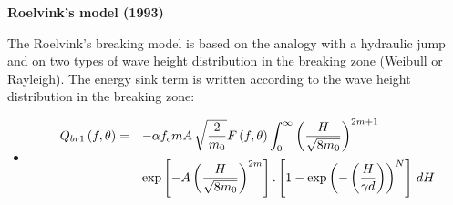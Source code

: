 {\bf  Roelvink's model (1993)}

 The Roelvink's breaking model \cite{Roelvink1993} is based on the analogy with a hydraulic jump and on two types of wave height distribution in the breaking zone (Weibull or Rayleigh). The energy sink term is written according to the wave height distribution in the breaking zone:

\begin{itemize}
\item  {}
\begin{equation} \label{GrindEQ__4_50_}
\barr{ll}
\dsp Q_{br1} \left(f,\theta \right)=&\dsp -\alpha f_{c} mA\,  \sqrt{\frac{2}{m_{0} } }F\left(f,\theta \right)\int _{0}^{\infty }\left(\frac{H}{\sqrt{8m_{0} } } \right)^{2m+1} \\[12pt]
\dsp &\dsp \exp \left[-A\left(\frac{H}{\sqrt{8m_{0} } } \right)^{2m} \right].\left[1-\exp \left(-\left(\frac{H}{\gamma d} \right)\right)^{N} \right] \, dH
\earr
\end{equation}
\end{itemize}

